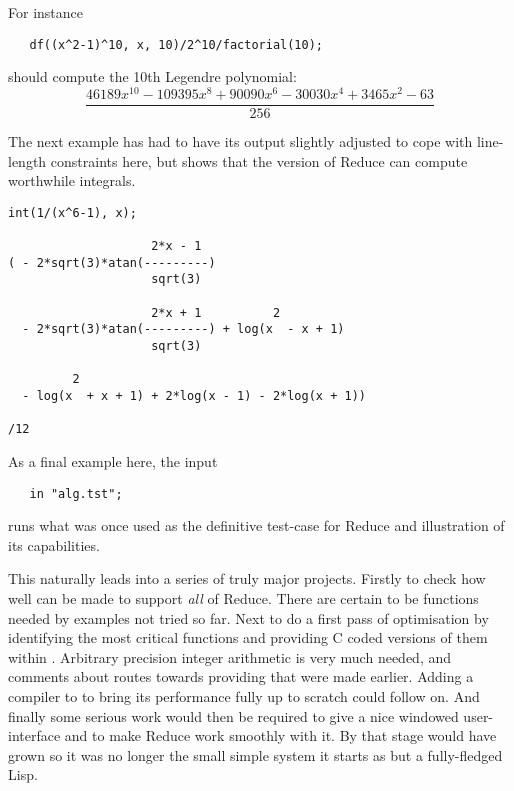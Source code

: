 For instance 
{\small\begin{verbatim}
   df((x^2-1)^10, x, 10)/2^10/factorial(10);
\end{verbatim}}
should compute the 10th Legendre polynomial:
\[ \frac{46189 x^{10} - 109395 x^{8} + 90090 x^{6} - 30030 x^{4} +
3465 x^{2} - 63}{256}\]

The next example has had to have its output slightly adjusted
to cope with line-length constraints here, but shows that the \vsl{}
version of Reduce can compute worthwhile integrals.
{\small\begin{verbatim}
int(1/(x^6-1), x);

                    2*x - 1
( - 2*sqrt(3)*atan(---------)
                    sqrt(3)

                    2*x + 1          2
  - 2*sqrt(3)*atan(---------) + log(x  - x + 1)
                    sqrt(3)

         2
  - log(x  + x + 1) + 2*log(x - 1) - 2*log(x + 1))

/12
\end{verbatim}}
As a final example here, the input
{\small\begin{verbatim}
   in "alg.tst";
\end{verbatim}}
runs what was once used as the definitive test-case for Reduce and
illustration of its capabilities.

This naturally leads into a series of truly major projects. Firstly to
check how well \vsl{} can be made to support {\em all} of Reduce. There are
certain to be functions needed by examples not tried so far. Next to
do a first pass of optimisation by identifying the most critical functions
and providing C coded versions of them within \vsl. Arbitrary precision
integer arithmetic is very much needed, and comments about routes towards
providing that were made earlier. Adding a compiler to \vsl{} to bring its
performance fully up to scratch could follow on. And finally some serious
work would then be required to give \vsl{} a nice windowed user-interface
and to make Reduce work smoothly with it. By that stage \vsl{} would have
grown so it was no longer the small simple system it starts as but
a fully-fledged Lisp. 

